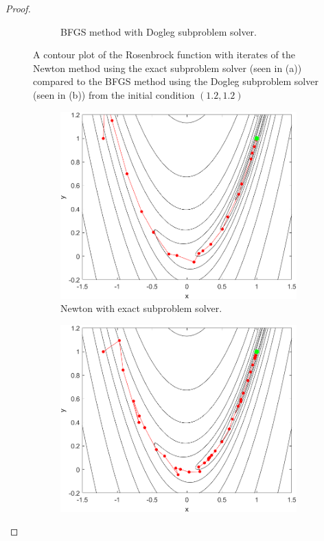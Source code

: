 \documentclass[12pt]{report}
\begin{document}
\begin{problem}
\begin{proof}
\begin{figure}[H]
\begin{subfigure}[b]{0.5\linewidth}
        \caption{BFGS method with Dogleg subproblem solver.}
        \label{fig4-1:b}
        \vspace{4ex}
    \end{subfigure}
    \caption{A contour plot of the Rosenbrock function with iterates of the Newton method using the exact subproblem solver (seen in (a)) compared to the BFGS method using the Dogleg subproblem solver (seen in (b)) from the initial condition $(1.2,1.2)$}
    \label{fig4-1}
\end{figure}
\begin{figure}[H]
    \begin{subfigure}[b]{0.5\linewidth}
        \centering
        \includegraphics[width=\linewidth]{images/4-cont-N--1.2,1.png}
        \caption{Newton with exact subproblem solver.}
        \label{fig4-2:a}
        \vspace{4ex}
    \end{subfigure}%
    \begin{subfigure}[b]{0.5\linewidth}
        \centering
        \includegraphics[width=\linewidth]{images/4-cont-BFGS--1.2,1.png}

\end{subfigure}
\end{figure}
\end{proof}
\end{problem}
\end{document}

